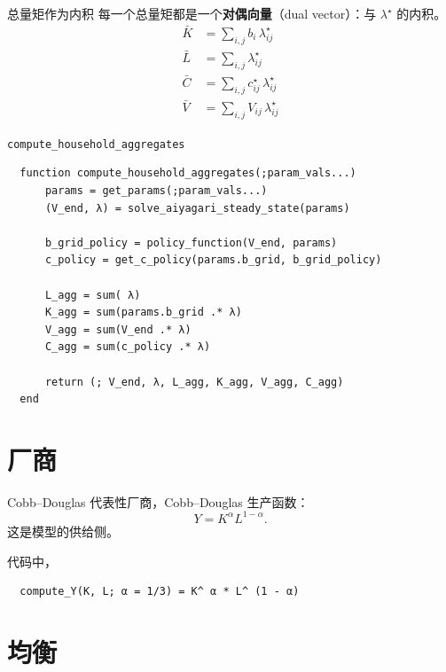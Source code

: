 \documentclass[10pt,aspectratio=169]{beamer}
\begin{document}
\begin{frame}{总量矩作为内积}
  每一个总量矩都是一个\textbf{对偶向量}（dual vector）：与 $\lambda^\star$ 的内积。
  \begin{align*}
    \bar K &= \sum_{i,j} b_i \, \lambda^\star_{ij} \\
    \bar L &= \sum_{i,j} \lambda^\star_{ij}        \\
    \bar C &= \sum_{i,j} c^\star_{ij} \, \lambda^\star_{ij} \\
    \bar V &= \sum_{i,j} V_{ij} \, \lambda^\star_{ij}
  \end{align*}
\end{frame}

\begin{frame}[fragile]{\texttt{compute\_household\_aggregates}}
  \begin{lstlisting}
  function compute_household_aggregates(;param_vals...)
      params = get_params(;param_vals...)
      (V_end, λ) = solve_aiyagari_steady_state(params)

      b_grid_policy = policy_function(V_end, params)
      c_policy = get_c_policy(params.b_grid, b_grid_policy)

      L_agg = sum( λ)
      K_agg = sum(params.b_grid .* λ)
      V_agg = sum(V_end .* λ)
      C_agg = sum(c_policy .* λ)

      return (; V_end, λ, L_agg, K_agg, V_agg, C_agg)
  end
  \end{lstlisting}
\end{frame}

\section{厂商}

\begin{frame}[fragile]{Cobb--Douglas}
  代表性厂商，Cobb--Douglas 生产函数：
  \[
    Y = K^\alpha L^{1-\alpha}.
  \]
  这是模型的供给侧。

  代码中，
  \begin{lstlisting}
  compute_Y(K, L; α = 1/3) = K^ α * L^ (1 - α)
  \end{lstlisting}
\end{frame}

\section{均衡}
\end{document}
